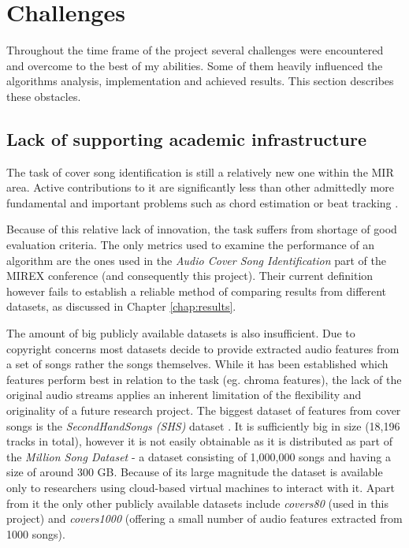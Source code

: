 
\chapter{Challenges}
\label{chap:challenges}
\ifpdf
    \graphicspath{{Algorithms/Figures/PNG/}{EvaluationTask/Figures/PDF/}{Algorithms/Figures/}}
\else
    \graphicspath{{Algorithms/Figures/EPS/}{EvaluationTask/Figures/}}
\fi


Throughout the time frame of the project several challenges were encountered and
overcome to the best of my abilities. Some of them heavily influenced the
algorithms analysis, implementation and achieved results. This section describes
these obstacles. 

\section{Lack of supporting academic infrastructure} 
\label{sec:academicinfra}

The task of cover song identification is still a relatively new one within the
MIR area. Active contributions to it are significantly less than other
admittedly more fundamental and important problems such as chord estimation or
beat tracking \cite{mirex}. 

Because of this relative lack of innovation, the task suffers from shortage of
good evaluation criteria. The only metrics used to examine the performance of an
algorithm are the ones used in the \textit{Audio Cover Song Identification} part
of the MIREX conference (and consequently this project). Their current
definition however fails to establish a reliable method of comparing results
from different datasets, as discussed in Chapter \ref{chap:results}.

The amount of big publicly available datasets is also insufficient. Due to
copyright concerns most datasets decide to provide extracted audio features from
a set of songs rather the songs themselves. While it has been established which
features perform best in relation to the task (eg. chroma features), the lack of
the original audio streams applies an inherent limitation of the flexibility and
originality of a future research project. The biggest dataset of features from
cover songs is the \textit{SecondHandSongs (SHS)} dataset \cite{shs}. It is
sufficiently big in size (18,196 tracks in total), however it is not easily
obtainable as it is distributed as part of the \textit{Million Song Dataset} - a
dataset consisting of 1,000,000 songs and having a size of around 300 GB.
Because of its large magnitude the dataset is available only to researchers
using cloud-based virtual machines to interact with it. Apart from it the only
other publicly available datasets include \textit{covers80} (used in this
project) and \textit{covers1000} (offering a small number of audio features
extracted from 1000 songs). 

